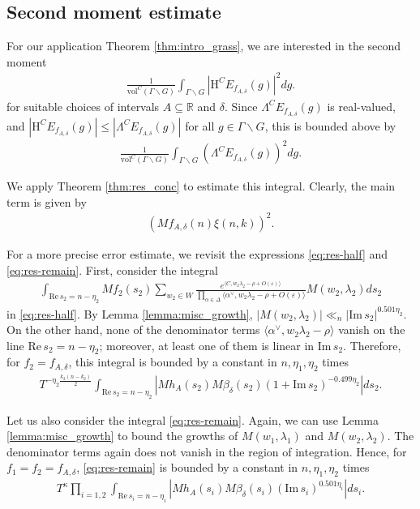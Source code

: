 \documentclass[11pt]{amsart}
\def\R{\mathbb{R}}
\numberwithin{theorem}{section}
\numberwithin{equation}{section}
\theoremstyle{remark}
\theoremstyle{definition}
\newcommand{\re}{\mathrm{Re}\,}
\newcommand{\im}{\mathrm{Im}\,}
\newcommand{\vol}{\mathrm{vol}}
\begin{document}
\subsection{Second moment estimate}

For our application Theorem \ref{thm:intro_grass}, we are interested in the second moment
\begin{align*}
\frac{1}{\vol^C(\Gamma\backslash G)}\int_{\Gamma \backslash G} \left|\mathrm H^CE_{f_{A,\delta}}(g)\right|^2dg.
\end{align*}
for suitable choices of intervals $A \subseteq \R$ and $\delta$.
Since $\Lambda^CE_{f_{A,\delta}}(g)$ is real-valued, and $|\mathrm H^CE_{f_{A,\delta}}(g)| \leq |\Lambda^CE_{f_{A,\delta}}(g)|$ for all $g \in \Gamma\backslash G$, this is bounded above by
\begin{align*}
\frac{1}{\vol^C(\Gamma\backslash G)}\int_{\Gamma \backslash G} \left(\Lambda^CE_{f_{A,\delta}}(g)\right)^2dg.
\end{align*}

We apply Theorem \ref{thm:res_conc} to estimate this integral. Clearly, the main term is given by
\begin{align*}
\left(Mf_{A,\delta}(n)\xi(n,k)\right)^2.
\end{align*}

For a more precise error estimate, we revisit the expressions \eqref{eq:res-half} and \eqref{eq:res-remain}. First, consider the integral
\begin{align*}
\int_{\re s_2=n-\eta_2} Mf_2(s_2)\sum_{w_2 \in W}\frac{e^{\langle C, w_2\lambda_2-\rho+O(\varepsilon)\rangle}}{\prod_{\alpha \in \Delta}\langle\alpha^\vee,w_2\lambda_2-\rho+O(\varepsilon)\rangle}M(w_2,\lambda_2)ds_2
\end{align*}
in \eqref{eq:res-half}. By Lemma \ref{lemma:misc_growth}, $|M(w_2,\lambda_2)| \ll_n |\im s_2|^{0.501\eta_2}$. On the other hand, none of the denominator terms $\langle\alpha^\vee,w_2\lambda_2-\rho\rangle$ vanish on the line $\re s_2=n-\eta_2$; moreover, at least one of them is linear in $\im s_2$. Therefore, for $f_2 = f_{A,\delta}$, this integral is bounded by a constant in $n,\eta_1,\eta_2$ times
\begin{align} \label{eq:prec_err_est1}
T^{-\eta_2 \frac{k_2(n-k_2)}{2}}\int_{\re s_2=n-\eta_2} \left|Mh_A(s_2)M\beta_\delta(s_2) (1+\im s_2)^{-0.499\eta_2}\right|ds_2.
\end{align}

Let us also consider the integral \eqref{eq:res-remain}. Again, we can use Lemma \ref{lemma:misc_growth} to bound the growths of $M(w_1,\lambda_1)$ and $M(w_2,\lambda_2)$. The denominator terms again does not vanish in the region of integration. Hence, for $f_1=f_2=f_{A,\delta}$, \eqref{eq:res-remain} is bounded by a constant in $n,\eta_1,\eta_2$ times
\begin{align} \label{eq:prec_err_est2}
T^{\kappa}\prod_{i=1,2}\int_{\re s_i=n-\eta_i} \left|Mh_A(s_i)M\beta_\delta(s_i) (\im s_i)^{0.501\eta_i}\right|ds_i.
\end{align}
\end{document}
